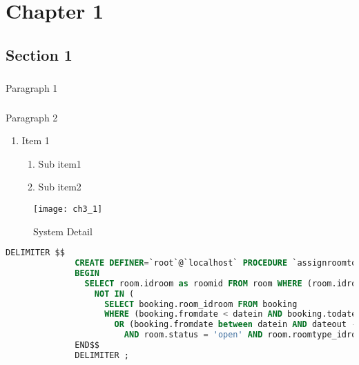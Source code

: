 

    \chapter{Chapter 1}
        \section{Section 1}

            \paragraph{}
                Paragraph 1

            \paragraph{}
                Paragraph 2

            \begin{enumerate}
            	\item Item 1
            	\begin{enumerate}
            		\item Sub item1
            		\item Sub item2
            	\end{enumerate}
            \end{enumerate}

            \begin{center}
              \begin{figure}
                \texttt{[image: ch3\_1]}
                \caption{System Detail}
                \label{sysdetail}
              \end{figure}
            \end{center}

            \ttfamily
              \begin{lstlisting}[language=SQL]
              DELIMITER $$
              CREATE DEFINER=`root`@`localhost` PROCEDURE `assignroomtobooking`(IN `datein` DATE, IN `dateout` DATE, IN `type` INT, OUT `roomid` INT)
              BEGIN
                SELECT room.idroom as roomid FROM room WHERE (room.idroom
                  NOT IN (
                    SELECT booking.room_idroom FROM booking
                    WHERE (booking.fromdate < datein AND booking.todate > datein)
                      OR (booking.fromdate between datein AND dateout - INTERVAL 1 DAY))
                        AND room.status = 'open' AND room.roomtype_idroomtype = type) LIMIT 1;
              END$$
              DELIMITER ;
              \end{lstlisting}
              \rmfamily


